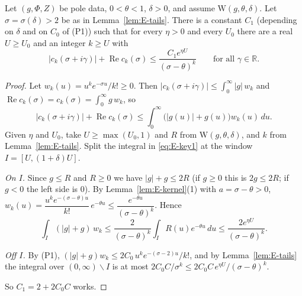 \begin{proposition}\label{prop:E-landau-key}

\par{}\par
Let $(g,\Phi,Z)$ be pole data, $0<\theta<1$, $\delta>0$, and assume $\mathrm W(g,\theta,\delta)$.
Let $\sigma=\sigma(\delta)>2$ be as in Lemma~\ref{lem:E-tails}. There is a constant $C_1$ (depending
on $\delta$ and on $C_0$ of \textup{(P1)}) such that for every $\eta>0$ and every $U_0$ there are a
real $U\ge U_0$ and an integer $k\ge U$ with
\[
|c_k(\sigma+i\gamma)|+\operatorname{Re}c_k(\sigma)\le\frac{C_1e^{\eta U}}{(\sigma-\theta)^{k}}
\qquad\text{for all }\gamma\in\mathbb R .
\]
\end{proposition}
\begin{proof}
Let $w_k(u)=u^{k}e^{-\sigma u}/k!\ge0$. Then
$|c_k(\sigma+i\gamma)|\le\int_0^\infty|g|\,w_k$ and
$\operatorname{Re}c_k(\sigma)=c_k(\sigma)=\int_0^\infty g\,w_k$, so
\begin{equation}\label{eq:E-key1}
|c_k(\sigma+i\gamma)|+\operatorname{Re}c_k(\sigma)\le\int_0^\infty\bigl(|g(u)|+g(u)\bigr)w_k(u)\,du .
\end{equation}
Given $\eta$ and $U_0$, take $U\ge\max(U_0,1)$ and $R$ from $\mathrm W(g,\theta,\delta)$, and $k$
from Lemma~\ref{lem:E-tails}. Split the integral in \eqref{eq:E-key1} at the window
$I=[U,(1+\delta)U]$.

\emph{On $I$.} Since $g\le R$ and $R\ge0$ we have $|g|+g\le2R$ (if $g\ge0$ this is $2g\le2R$; if
$g<0$ the left side is $0$). By Lemma~\ref{lem:E-kernel}(1) with $a=\sigma-\theta>0$,
$w_k(u)=\dfrac{u^{k}e^{-(\sigma-\theta)u}}{k!}\,e^{-\theta u}\le
\dfrac{e^{-\theta u}}{(\sigma-\theta)^{k}}$. Hence
\[
\int_I(|g|+g)\,w_k\le\frac{2}{(\sigma-\theta)^{k}}\int_IR(u)e^{-\theta u}\,du\le
\frac{2e^{\eta U}}{(\sigma-\theta)^{k}} .
\]

\emph{Off $I$.} By (P1), $(|g|+g)w_k\le2C_0\,u^{k}e^{-(\sigma-2)u}/k!$, and by
Lemma~\ref{lem:E-tails} the integral over $(0,\infty)\smallsetminus I$ is at most
$2C_0C/\sigma^{k}\le2C_0C\,e^{\eta U}/(\sigma-\theta)^{k}$.

So $C_1=2+2C_0C$ works.

\end{proof}

